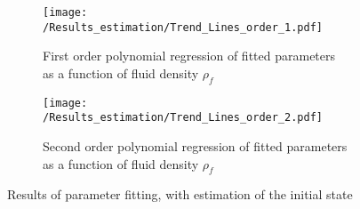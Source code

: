 \documentclass[../Article_Model_Parameters.tex]{subfiles}
\begin{document}
	\begin{figure*}[!h]
	\centering
	\begin{subfigure}[b]{0.85\textwidth}
		\centering
		\texttt{[image: /Results\_estimation/Trend\_Lines\_order\_1.pdf]}
		\caption{First order polynomial regression of fitted parameters as a function of fluid density $\rho_f$}
	\end{subfigure}
	\hfill
	\begin{subfigure}[b]{0.85\textwidth}
		\centering
		\texttt{[image: /Results\_estimation/Trend\_Lines\_order\_2.pdf]}
		\caption{Second order polynomial regression of fitted parameters as a function of fluid density $\rho_f$}
	\end{subfigure}
	\caption{Results of parameter fitting, with estimation of the initial state}
	\end{figure*}
	
	
\end{document}
